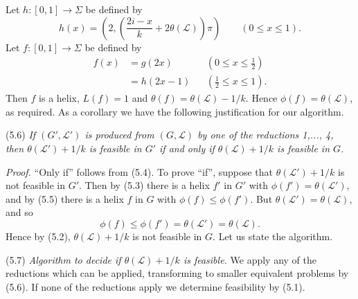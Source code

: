 Let $h \colon [0, 1] \to \Sigma$ be defined by
\begin{equation*}
h(x) = \left( 2, \left( \frac{2i-x}{k} + 2\theta(\mathscr{L}) \right) \pi \right) \qquad (0 \le x \le 1).
\end{equation*}
Let $f \colon [0, 1] \to \Sigma$ be defined by
\begin{align*}
f(x) &= g(2x) && (0 \le x \le \frac{1}{2}) \\
&= h(2x - 1) && (\frac{1}{2} \le x \le 1).
\end{align*}
Then $f$ is a helix, $L(f) = 1$ and $\theta(f) = \theta(\mathscr{L}) - 1/k$. Hence $\phi(f) = \theta(\mathscr{L})$, as required. As a corollary we have the following justification for our algorithm.

\stmt
(5.6) \textit{If $(G', \mathscr{L}')$ is produced from $(G, \mathscr{L})$ by one of the reductions 1,..., 4, then $\theta(\mathscr{L}') + 1/k$ is feasible in $G'$ if and only if $\theta(\mathscr{L}) + 1/k$ is feasible in $G$.}

\textit{Proof.} ``Only if'' follows from (5.4). To prove ``if'', suppose that $\theta(\mathscr{L}') + 1/k$ is not feasible in $G'$. Then by (5.3) there is a helix $f'$ in $G'$ with $\phi(f') = \theta(\mathscr{L}')$, and by (5.5) there is a helix $f$ in $G$ with $\phi(f) \le \phi(f')$. But $\theta(\mathscr{L}') = \theta(\mathscr{L})$, and so
\begin{equation*}
\phi(f) \le \phi(f') = \theta(\mathscr{L}') = \theta(\mathscr{L}).
\end{equation*}
Hence by (5.2), $\theta(\mathscr{L}) + 1/k$ is not feasible in $G$. Let us state the algorithm.

\stmt
(5.7) \textit{Algorithm to decide if $\theta(\mathscr{L}) + 1/k$ is feasible.} We apply any of the reductions which can be applied, transforming to smaller equivalent problems by (5.6). If none of the reductions apply we determine feasibility by (5.1).

